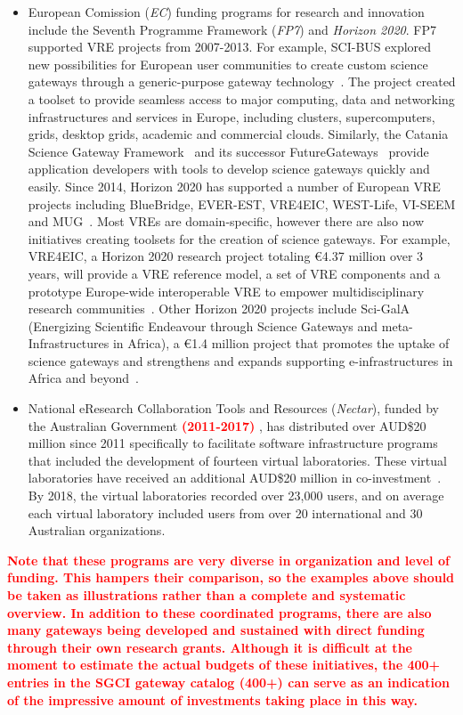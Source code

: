 \documentclass[review]{elsarticle}
\newcommand{\changedtext}[1]{
	\textcolor{red}{\textbf{#1}}
}
\begin{document}
\begin{itemize}
\item European Comission (\emph{EC}) funding programs for research and innovation include the Seventh Programme Framework (\emph{FP7}) and \emph{Horizon 2020}. FP7 supported VRE projects from 2007-2013.
For example, SCI-BUS explored new possibilities for European user communities to create custom science gateways through a generic-purpose gateway technology~\cite{kacsuk2014-18}. 
The project created a toolset to provide seamless access to major computing, data and networking infrastructures and services in Europe, including clusters, supercomputers, grids, desktop grids, academic and commercial clouds. Similarly, the Catania Science Gateway Framework~\cite{decide-19} and its successor FutureGateways~\cite{futuregateway} provide application developers with tools to develop science gateways quickly and easily. 
Since 2014, Horizon 2020 has supported a number of European VRE projects including BlueBridge, EVER-EST, VRE4EIC, WEST-Life, VI-SEEM and MUG~\cite{h2020-projects-20}. 
Most VREs are domain-specific, however there are also now initiatives creating toolsets for the creation of science gateways. 
For example, VRE4EIC, a Horizon 2020 research project totaling \euro 4.37 million over 3 years, will provide a VRE reference model, a set of VRE components and a prototype Europe-wide interoperable VRE to empower multidisciplinary research communities~\cite{vre4eic-21}. 
Other Horizon 2020 projects include Sci-GalA (Energizing Scientific Endeavour through Science Gateways and meta-Infrastructures in Africa), a \euro 1.4 million project that promotes the uptake of science gateways and strengthens and expands supporting e-infrastructures in Africa and beyond~\cite{sci-gaia-22}.

\item National eResearch Collaboration Tools and Resources (\emph{Nectar}), funded by the Australian Government \changedtext{(2011-2017)}, has distributed over AUD\$20 million since 2011 specifically to facilitate software infrastructure programs that included the development of fourteen virtual laboratories. These virtual laboratories have received an additional AUD\$20 million in co-investment~\cite{nectar-impact-3}. By 2018, the virtual laboratories recorded over 23,000 users, and on average each virtual laboratory included users from over 20 international and 30 Australian organizations.

\end{itemize}

\changedtext{Note that these programs are very diverse in organization and level of funding. This hampers their comparison, so the examples above should be taken as illustrations rather than a complete and systematic overview.
In addition to these coordinated programs, there are also many gateways being developed and sustained with direct funding through their own research grants. Although it is difficult at the moment to estimate the actual budgets of these initiatives, the 400+ entries in the SGCI gateway catalog\cite{sgci-16} (400+) can serve as an indication of the impressive amount of investments taking place in this way.}
\end{document}
